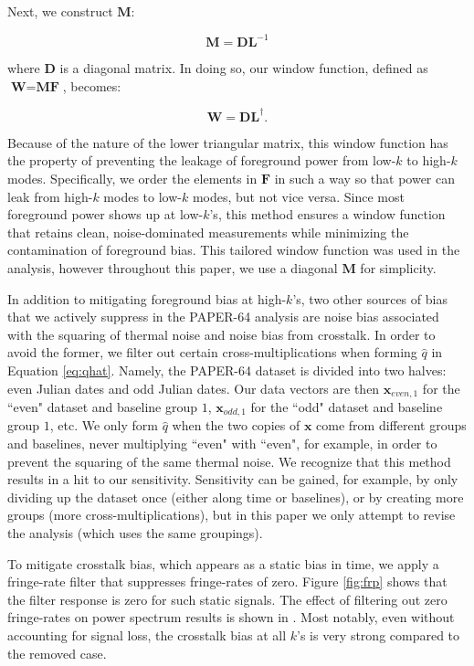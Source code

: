 \documentclass[preprint2,numberedappendix,tighten]{aastex6}
\begin{document}
\noindent Next, we construct $\textbf{M}$:

\begin{equation}
\textbf{M} = \textbf{DL}^{-1}
\end{equation}

\noindent where $\textbf{D}$ is a diagonal matrix. In doing so, our window function, defined as $\textbf{W} = \textbf{MF}$, 
becomes:

\begin{equation}
\textbf{W} = \textbf{DL}^{\dagger}.
\end{equation}

\noindent Because of the nature of the lower triangular matrix, this window function has the property of preventing the leakage 
of foreground power from low-$k$ to high-$k$ modes. Specifically, we order the elements in $\textbf{F}$ in such a way so that 
power can leak from high-$k$ modes to low-$k$ modes, but not vice versa. Since most foreground power shows up at low-$k$'s, this method ensures a window function that retains clean, noise-dominated measurements while minimizing the 
contamination of foreground bias. This tailored window function was used in the  analysis, however throughout this paper, we use a diagonal $\textbf{M}$ for simplicity.

In addition to mitigating foreground bias at high-$k$'s, two other sources of bias that we actively suppress in the PAPER-64 
analysis are noise bias associated with the squaring of thermal noise and noise bias from crosstalk. In order to avoid the 
former, we filter out certain cross-multiplications when forming $\widehat{q}$ in Equation \eqref{eq:qhat}. Namely, the PAPER-64 
dataset is divided into two halves: even Julian dates and odd Julian dates. Our data vectors are then $\textbf{x}_{even, 1}$ for 
the ``even" dataset and baseline group $1$, $\textbf{x}_{odd, 1}$ for the ``odd" dataset and baseline group $1$, etc. We only form 
$\widehat{q}$ when the two copies of $\textbf{x}$ come from different groups and baselines, never multiplying ``even" with ``even", for 
example, in order to prevent the squaring of the same thermal noise. We recognize that this method results in a hit to our sensitivity. Sensitivity can be gained, for example, by only dividing up the dataset once (either along time or baselines), or by creating more groups (more cross-multiplications), but in this paper we only attempt to revise the  analysis (which uses the same groupings).

To mitigate crosstalk bias, which appears as a static bias in time, we apply a fringe-rate filter that suppresses fringe-rates of 
zero. Figure \ref{fig:frp} shows that the filter response is zero for such static signals. The effect of filtering out zero fringe-rates 
on power spectrum results is shown in . Most notably, even without accounting for signal loss, the crosstalk bias at all $k$'s is very strong compared to the removed case.
\end{document}
